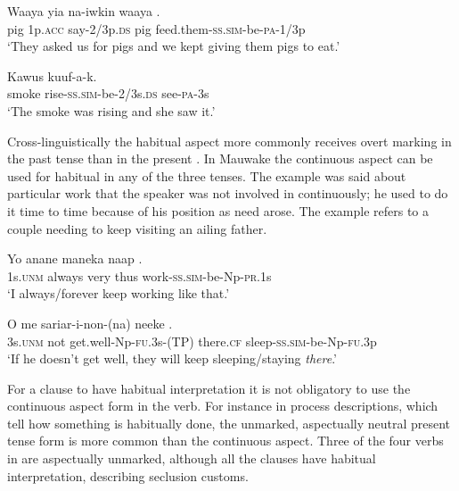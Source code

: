 \ea%
\label{ex:3:x354}
\gll Waaya yia na-iwkin waaya . \\
pig 1p.\textsc{acc} say-2/3p.\textsc{ds} pig feed.them-\textsc{ss}.\textsc{sim}-be-\textsc{pa}-1/3p\\
\glt`They asked us for pigs and we kept giving them pigs to eat.'
\z

\ea%
\label{ex:3:x355}
\gll Kawus  kuuf-a-k. \\
smoke rise-\textsc{ss}.\textsc{sim}-be-2/3s.\textsc{ds} see-\textsc{pa}-3s\\
\glt`The smoke was rising and she saw it.'
\z

Cross-linguistically the habitual aspect more commonly receives overt marking in the past tense than in the present \citep[154]{Cristofaro2006}. In Mauwake the continuous aspect can be used for habitual in any of the three tenses. The example  was said about particular work that the speaker was not involved in continuously; he used to do it time to time because of his position as need arose. The example  refers to a couple needing to keep visiting an ailing father. 

\ea%
\label{ex:3:x1063}
\gll Yo anane maneka naap . \\
1s.\textsc{unm} always very thus work-\textsc{ss}.\textsc{sim}-be-Np-\textsc{pr}.1s\\
\glt`I always/forever keep working like that.'
\z

\ea%
\label{ex:3:x1064}
\gll O me sariar-i-non-(na) neeke . \\
3s.\textsc{unm} not get.well-Np-\textsc{fu}.3s-(TP) there.\textsc{cf} sleep-\textsc{ss}.\textsc{sim}-be-Np-\textsc{fu}.3p\\
\glt`If he doesn't get well, they will keep sleeping/staying \textit{there}.' 
\z

For a clause to have habitual interpretation it is not obligatory to use the continuous aspect form in the verb. For instance in process descriptions, which tell how something is habitually done, the unmarked, aspectually neutral present tense form is more common than the continuous aspect. Three of the four verbs in  are aspectually unmarked, although all the clauses have habitual interpretation, describing seclusion customs.

